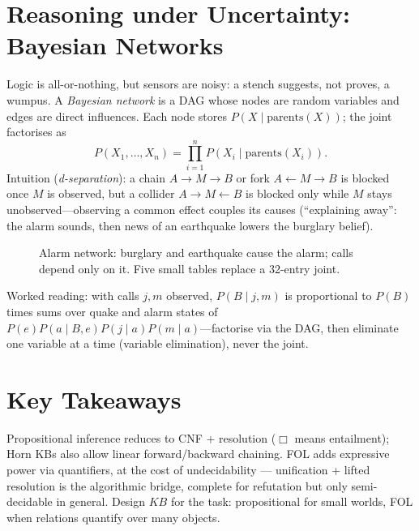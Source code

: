 \section{Reasoning under Uncertainty: Bayesian Networks}
Logic is all-or-nothing, but sensors are noisy: a stench suggests, not proves, a wumpus.
A \emph{Bayesian network} is a DAG whose nodes are random variables and edges are direct
influences. Each node stores $P(X \mid \text{parents}(X))$; the joint factorises as
\begin{equation}
P(X_1,\dots,X_n) = \prod_{i=1}^{n} P(X_i \mid \text{parents}(X_i)).
\end{equation}
Intuition (\emph{d-separation}): a chain $A \to M \to B$ or fork $A \gets M \to B$ is blocked
once $M$ is observed, but a collider $A \to M \gets B$ is blocked only while $M$ stays
unobserved---observing a common effect couples its causes (``explaining away'': the alarm
sounds, then news of an earthquake lowers the burglary belief).
\begin{figure}[h]\centering
{}
\caption{Alarm network: burglary and earthquake cause the alarm; calls depend only on it. Five small tables replace a 32-entry joint.}
\label{fig:alarm-net}
\end{figure}
Worked reading: with calls $j,m$ observed, $P(B \mid j, m)$ is proportional to $P(B)$ times
sums over quake and alarm states of $P(e)P(a \mid B,e)P(j \mid a)P(m \mid a)$---factorise
via the DAG, then eliminate one variable at a time (variable elimination), never the joint.
\section{Key Takeaways}
Propositional inference reduces to CNF + resolution ($\Box$ means entailment); Horn KBs also allow linear forward/backward chaining. FOL adds expressive power via quantifiers, at the cost of undecidability --- unification + lifted resolution is the algorithmic bridge, complete for refutation but only semi-decidable in general. Design $KB$ for the task: propositional for small worlds, FOL when relations quantify over many objects.

